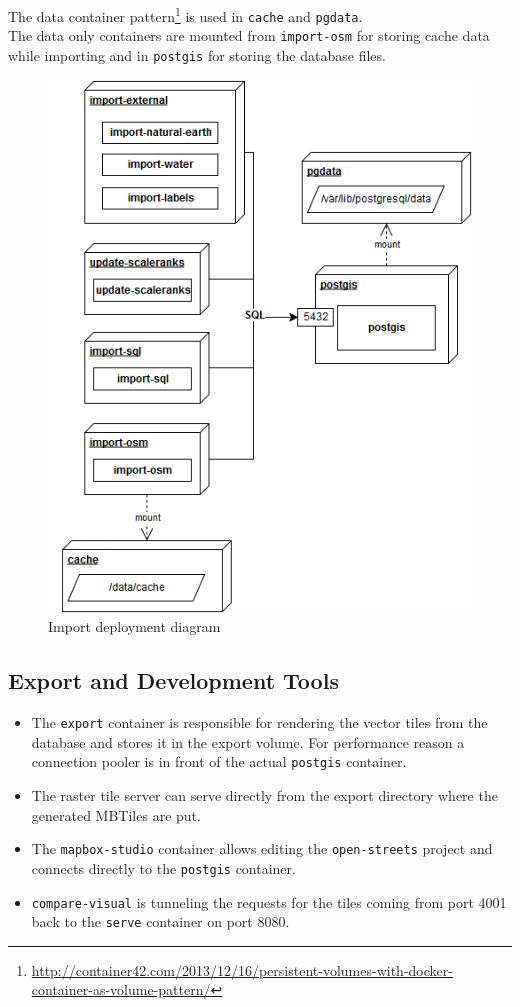 The data container pattern\footnote{\url{http://container42.com/2013/12/16/persistent-volumes-with-docker-container-as-volume-pattern/}} is used in \texttt{cache} and \texttt{pgdata}. \\
The data only containers are mounted from \texttt{import-osm} for storing cache data while importing and in \texttt{postgis} for storing the database files.

\begin{figure}[H]
  \includegraphics[scale=0.6]{images/deployment_diagram_import.png}
  \caption{Import deployment diagram}
\end{figure}

\newpage
\subsection{Export and Development Tools}

\begin{itemize}
\item The \texttt{export} container is responsible for rendering the vector tiles from the database and stores it in the export volume. For performance reason a connection pooler is in front of the actual \texttt{postgis} container.
\item The raster tile server can serve directly from the export directory where the generated MBTiles are put.
\item The \texttt{mapbox-studio} container allows editing the \texttt{open-streets} project and connects directly to the \texttt{postgis} container.
\item \texttt{compare-visual} is tunneling the requests for the tiles coming from port 4001 back to the \texttt{serve} container on port 8080.
\end{itemize}

